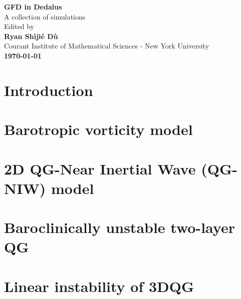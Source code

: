 \documentclass[11pt,letterpaper]{book}
\begin{document}
\begin{titlepage}
    \begin{center}
        \vspace*{4cm}
        \Huge
        \textbf{GFD in Dedalus} \\
        \vspace{0.5cm}
        \LARGE
        {A collection of simulations}\\
        \vspace{3cm}
        Edited by\\
        \vspace{0.5cm}
        \textbf{Ryan Sh\`iji\'e D\`u}\\
        \vspace{0.2cm}
        \normalsize
        {Courant Institute of Mathematical Sciences - New York University}\\
        \vspace{2cm}
        \Large
        \textbf{\today}
        
    \end{center}
\end{titlepage}

\setcounter{tocdepth}{4}
\tableofcontents
\chapter{Introduction}


\chapter{Barotropic vorticity model}\label{chap:Baro_vort}


% 

\chapter{2D QG-Near Inertial Wave (QG-NIW) model}


\chapter{Baroclinically unstable two-layer QG}


\chapter{Linear instability of 3DQG}





\newpage
\printbibliography
\end{document}
